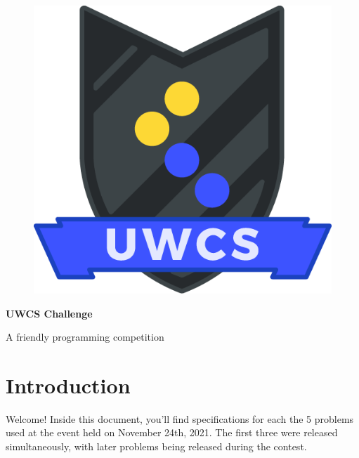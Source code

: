 \documentclass[a4paper,12pt,parskip=half-]{scrartcl}
\begin{document}
\begin{figure}
    \vspace{-10pt} %
    \includegraphics[width=0.8\linewidth]{shield.png} %
    \vspace{-100pt} %
\end{figure}

\normalfont \Huge \bfseries UWCS Challenge

\normalfont\Large A friendly programming competition
\normalsize

\section*{Introduction}

Welcome! 
Inside this document, you'll find specifications for each the 5 problems used at the event held on November 24th, 2021.
The first three were released simultaneously, with later problems being released during the contest.

\tableofcontents

\newpage



\newpage

\newpage

\newpage

\newpage






% 
% 
% 
% 
% 
\end{document}

